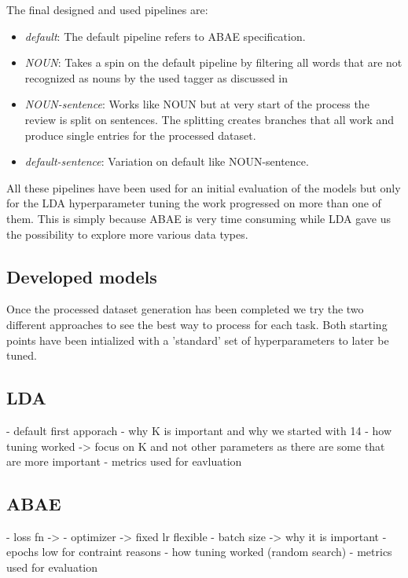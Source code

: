 The final designed and used pipelines are:
\begin{itemize}
    \item {\textit{default}}: The default pipeline refers to ABAE specification.

    \item {\textit{NOUN}}: Takes a spin on the default pipeline by filtering all words that are not recognized as nouns
    by the used tagger as discussed in %

    \item {\textit{NOUN-sentence}}: Works like NOUN but at very start of the process the review is split on sentences.
    The splitting creates branches that all work and produce single entries for the processed dataset.

    \item {\textit{default-sentence}}: Variation on default like NOUN-sentence.
\end{itemize}

All these pipelines have been used for an initial evaluation of the models but only for the LDA hyperparameter
tuning the work progressed on more than one of them. This is simply because ABAE is very time consuming while LDA
gave us the possibility to explore more various data types.

\subsection{Developed models}
Once the processed dataset generation has been completed we try the two different approaches to see the best way
to process for each task. Both starting points have been intialized with a 'standard' set of hyperparameters
to later be tuned.

\subsection{LDA}
- default first apporach
- why K is important and why we started with 14
- how tuning worked -> focus on K and not other parameters as there are some that are more important
- metrics used for eavluation

\subsection{ABAE}
- loss fn ->
- optimizer -> fixed lr flexible
- batch size -> why it is important
- epochs low for contraint reasons
- how tuning worked (random search)
- metrics used for evaluation
